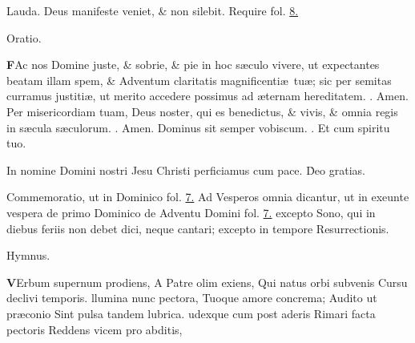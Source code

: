 \documentclass[letter,11pt]{book}
\makeatletter
\DeclareRobustCommand{\Rbar}{\vers@resp{0pt}{R}}
\newcommand{\vers@resp@sym}{\raisebox{0.2ex}{\rotatebox[origin=c]{-20}{$\m@th\rceil$}}}
\newcommand{\vers@resp}[2]{%
  {\ooalign{\hidewidth\kern#1\vers@resp@sym\hidewidth\cr#2\cr}}%
}%
\def\R{\color{Red} \Rbar . \color{black}}
\makeatother
\begin{document}
\begin{multicols}{2}
\newline \color{Red} Lauda. \color{black} Deus manifeste veniet, \& non silebit. \color{Red} Require fol. \color{black} \hyperlink{page.8}{8.}
\vspace{-.75em} \begin{center} \color{Red} Oratio. \end{center} \vspace{-.75em}
\lettrine[lines=2]{\bfseries \color{Red} F}{}Ac nos Domine juste, \& sobrie, \& pie in hoc s\ae culo vivere, ut expectantes beatam illam spem, \& Adventum claritatis magnificenti\ae \ tu\ae ; sic per semitas curramus justiti\ae , ut merito accedere possimus ad \ae ternam hereditatem. \R Amen. Per misericordiam tuam, Deus noster, qui es benedictus, \& vivis, \& omnia regis in s\ae cula s\ae culorum. \R Amen. Dominus sit semper vobiscum. \R Et cum spiritu tuo.
\par In nomine Domini nostri Jesu Christi perficiamus cum pace. \. Deo gratias.
\par \color{Red} Commemoratio, ut in Dominico \color{Red} fol. \color{black} \hyperlink{page.7}{7.}
\newline \color{Red} \hypertarget{MON-PRIMA-ADV-VES}{Ad Vesperos} omnia dicantur, ut in exeunte vespera de primo Dominico de Adventu Domini fol. \hyperlink{DOM-PRIMA-ADV-VES-II}{\color{black} 7.} excepto Sono, qui in diebus feriis non debet dici, neque cantari; excepto in tempore Resurrectionis. \color{black}
\vspace{-.75em} \begin{center} \color{Red} Hymnus. \end{center} \vspace{-.75em}
\lettrine[lines=2]{\bfseries \color{Red} V}{}Erbum supernum prodiens,
\newline A Patre olim exiens,
\newline \indent Qui natus orbi subvenis
\newline \indent Cursu declivi temporis.
llumina nunc pectora,
\newline \indent Tuoque amore concrema;
\newline \indent Audito ut pr\ae conio
\newline \indent Sint pulsa tandem lubrica.
udexque cum post aderis
\newline \indent Rimari facta pectoris
\newline \indent Reddens vicem pro abditis,

\end{multicols}
\end{document}
